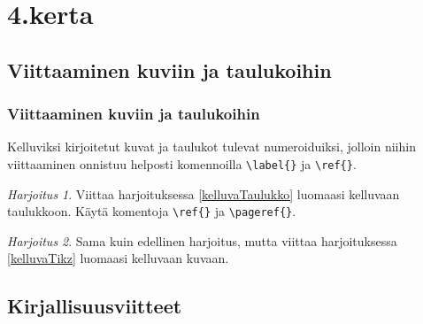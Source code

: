 \documentclass[handout,hyperref={colorlinks=true}]{beamer}
\theoremstyle{remark}
\newtheorem{harj}{Harjoitus}[section]
\newcommand{\vaihto}{\\ \vspace{10pt}}
\begin{document}
\section{4.kerta}
\subsection{Viittaaminen kuviin ja taulukoihin}
\begin{frame}[fragile]
    \frametitle{Viittaaminen kuviin ja taulukoihin}
    Kelluviksi kirjoitetut kuvat ja taulukot tulevat numeroiduiksi, jolloin niihin viittaaminen onnistuu helposti komennoilla \verb-\label{}- ja \verb-\ref{}-. 
    \begin{harj}
        Viittaa harjoituksessa \ref{kelluvaTaulukko} luomaasi kelluvaan taulukkoon. Käytä komentoja \verb-\ref{}- ja \verb-\pageref{}-.
        \vaihto
    \end{harj}
    \begin{harj}
        Sama kuin edellinen harjoitus, mutta viittaa harjoituksessa \ref{kelluvaTikz} luomaasi kelluvaan kuvaan.
    \end{harj}
\end{frame}
\subsection{Kirjallisuusviitteet}
\end{document}
